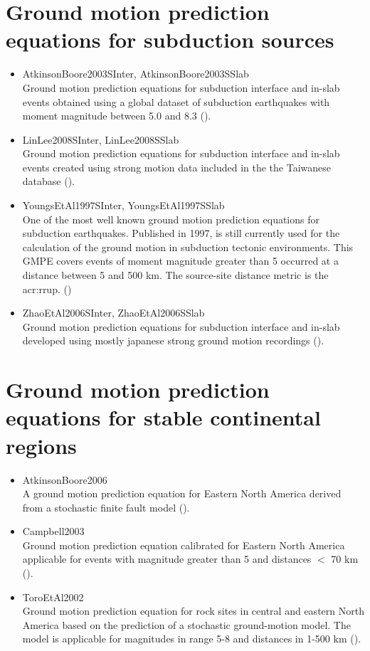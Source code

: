 \section[GMPEs for subduction sources]{Ground motion prediction equations for subduction sources}
\begin{itemize}
    \item AtkinsonBoore2003SInter, AtkinsonBoore2003SSlab \hfill \\ Ground 
	    motion prediction equations for 
        subduction interface and in-slab events obtained using a global 
        dataset of subduction earthquakes with moment magnitude between 
        5.0 and 8.3 (\cite{atkinson2003}).
    \item LinLee2008SInter, LinLee2008SSlab \hfill \\ Ground motion 
	    prediction equations for subduction
        interface and in-slab events created using strong motion
        data included in the the Taiwanese database (\cite{lin2008}).
    \item YoungsEtAl1997SInter, YoungsEtAl1997SSlab \hfill \\ One of the most  
	    well known ground motion 
        prediction equations for subduction earthquakes. Published in 1997,
        is still currently used for the calculation of the ground motion 
        in subduction tectonic environments. This GMPE covers events of 
        moment magnitude greater than 5 occurred at a distance between 5
        and 500 km. The source-site distance metric is the \gls{acr:rrup}.      
		(\cite{youngs1997})
    \item ZhaoEtAl2006SInter, ZhaoEtAl2006SSlab \hfill \\ 
	    Ground motion pre\-dic\-tion
	    equa\-tions for subduction interface and in-slab developed using mostly
	    japanese strong ground motion recordings (\cite{zhao2006}).
\end{itemize}
%
\section[GMPEs for stable continental regions]{Ground motion prediction equations for stable continental regions}
\begin{itemize}
    \item AtkinsonBoore2006 \hfill \\ 
	A ground motion prediction equation for Eastern 
	North America derived from a stochastic finite fault model 
	(\cite{atkinson2006}).
    \item Campbell2003 \hfill \\ 
	Ground motion prediction equation calibrated for Eastern North America 
	applicable for events with magnitude greater than 5 and distances $<$ 70 km 
	(\cite{campbell2003}).
    \item ToroEtAl2002 \hfill \\ Ground motion prediction equation for rock 	
	sites in central and eastern North America
    based on the prediction of a stochastic ground-motion model. The model is 
	applicable for magnitudes in range 5-8 and distances in 1-500 km 
	(\cite{toro2002}).
\end{itemize}
